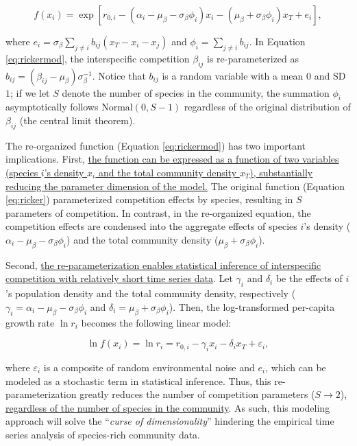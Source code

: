 \documentclass[12pt, class=article, crop=false]{standalone}
\begin{document}
\begin{equation}
\label{eq:rickermod}
f(x_i) = \exp\left[r_{0,i} - (\alpha_i - \mu_{\beta} - \sigma_{\beta} \phi_i) x_i - (\mu_{\beta} + \sigma_{\beta} \phi_i) x_T + e_i \right],
\end{equation}

where $e_i = \sigma_{\beta} \sum_{j \ne i} b_{ij} (x_T - x_i - x_j)$ and $\phi_i = \sum_{j \ne i} b_{ij}$.
In Equation \ref{eq:rickermod}, the interspecific competition $\beta_{ij}$ is re-parameterized as $b_{ij} = (\beta_{ij} - \mu_{\beta}) \sigma_{\beta}^{-1}$.
Notice that $b_{ij}$ is a random variable with a mean $0$ and SD $1$; if we let $S$ denote the number of species in the community, the summation $\phi_i$ asymptotically follows $\mbox{Normal}(0, S - 1)$ regardless of the original distribution of $\beta_{ij}$ (the central limit theorem).

The re-organized function (Equation \ref{eq:rickermod}) has two important implications.
First, \ul{the function can be expressed as a function of two variables (species $i$'s density $x_i$ and the total community density $x_T$), substantially reducing the parameter dimension of the model.}
The original function (Equation \ref{eq:ricker}) parameterized competition effects by species, resulting in $S$ parameters of competition.
In contrast, in the re-organized equation, the competition effects are condensed into the aggregate effects of species $i$'s density ($\alpha_i - \mu_{\beta} - \sigma_{\beta} \phi_i$) and the total community density ($\mu_{\beta} + \sigma_{\beta} \phi_i$).

Second, \ul{the re-parameterization enables statistical inference of interspecific competition with relatively short time series data}.
Let $\gamma_i$ and $\delta_i$ be the effects of $i$'s population density and the total community density, respectively ($\gamma_i = \alpha_i - \mu_{\beta} - \sigma_{\beta} \phi_i$ and $\delta_i = \mu_{\beta} + \sigma_{\beta} \phi_i$).
Then, the log-transformed per-capita growth rate $\ln r_i$ becomes the following linear model:

\begin{equation}
\label{eq:rickerlog}
    \ln f(x_i) = \ln r_i = r_{0,i} - \gamma_i x_i - \delta_i x_T + \varepsilon_i,
\end{equation}

where $\varepsilon_i$ is a composite of random environmental noise and $e_i$, which can be modeled as a stochastic term in statistical inference. Thus, this re-parameterization greatly reduces the number of competition parameters ($S \rightarrow 2$), \ul{regardless of the number of species in the community}.
As such, this modeling approach will solve the ``\textit{curse of dimensionality}'' hindering the empirical time series analysis of species-rich community data.
\end{document}
